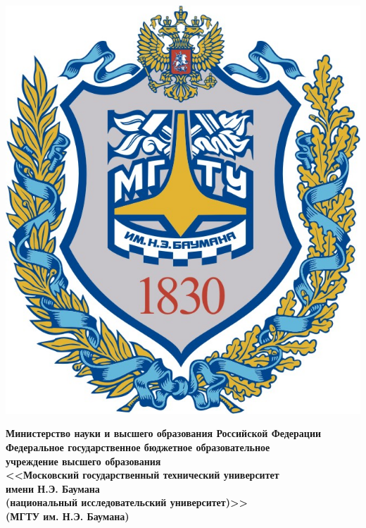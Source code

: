 \begin{titlepage}

	\noindent\begin{minipage}{0.05\textwidth}
		\includegraphics[scale=0.4]{inc/bmstu.png}
	\end{minipage}
	\hfill
	\begin{minipage}{0.85\textwidth}\raggedleft
		\begin{center}
			\fontsize{12pt}{0.3\baselineskip}\selectfont \textbf{Министерство науки и высшего образования Российской Федерации \\ Федеральное государственное бюджетное образовательное \\ учреждение высшего образования \\ <<Московский государственный технический университет \\ имени Н.Э. Баумана \\ (национальный исследовательский университет)>> \\ (МГТУ им. Н.Э. Баумана)}
		\end{center}
	\end{minipage}

	\begin{center}
		\fontsize{12pt}{0.1\baselineskip}\selectfont
		\noindent\makebox[\linewidth]{\rule{\textwidth}{4pt}} \makebox[\linewidth]{\rule{\textwidth}{1pt}}
	\end{center}


\end{titlepage}
